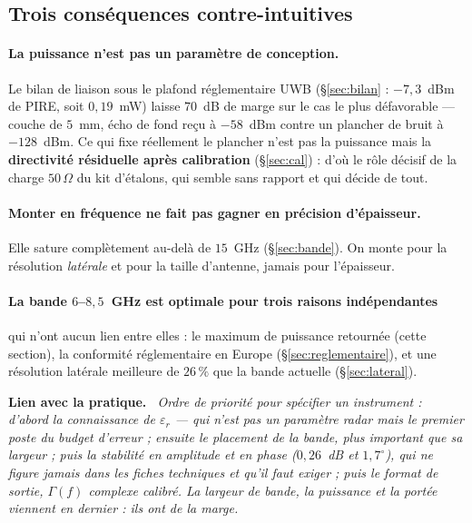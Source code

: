 \documentclass[11pt,a4paper]{article}
\newenvironment{implication}%
  {\par\medskip\begin{lrbox}{\implbox}\begin{minipage}{0.95\textwidth}%
   \textbf{Lien avec la pratique.}\itshape\ }%
  {\end{minipage}\end{lrbox}\noindent\fbox{\usebox{\implbox}}\par\medskip}
\newcommand{\eps}{\varepsilon_r}
\begin{document}
\subsection{Trois conséquences contre-intuitives}

\paragraph{La puissance n'est pas un paramètre de conception.} Le bilan de
liaison sous le plafond réglementaire UWB (\S\ref{sec:bilan} : $-7{,}3$~dBm de
PIRE, soit $0{,}19$~mW) laisse $70$~dB de marge sur le cas le plus défavorable
--- couche de $5$~mm, écho de fond reçu à $-58$~dBm contre un plancher de bruit
à $-128$~dBm. Ce qui fixe réellement le plancher n'est pas la puissance mais la
\textbf{directivité résiduelle après calibration} (\S\ref{sec:cal}) : d'où le
rôle décisif de la charge $50\,\Omega$ du kit d'étalons, qui semble sans
rapport et qui décide de tout.

\paragraph{Monter en fréquence ne fait pas gagner en précision d'épaisseur.}
Elle sature complètement au-delà de $15$~GHz (\S\ref{sec:bande}). On monte pour
la résolution \emph{latérale} et pour la taille d'antenne, jamais pour
l'épaisseur.

\paragraph{La bande $6$--$8{,}5$~GHz est optimale pour trois raisons
indépendantes} qui n'ont aucun lien entre elles : le maximum de puissance
retournée (cette section), la conformité réglementaire en Europe
(\S\ref{sec:reglementaire}), et une résolution latérale meilleure de $26\,\%$
que la bande actuelle (\S\ref{sec:lateral}).

\begin{implication}
Ordre de priorité pour spécifier un instrument : d'abord la connaissance de
$\eps$ --- qui n'est pas un paramètre radar mais le premier poste du budget
d'erreur ; ensuite le \emph{placement} de la bande, plus important que sa
largeur ; puis la stabilité en amplitude et en phase ($0{,}26$~dB et
$1{,}7^\circ$), qui ne figure jamais dans les fiches techniques et qu'il faut
exiger ; puis le format de sortie, $\Gamma(f)$ complexe calibré. La largeur de
bande, la puissance et la portée viennent en dernier : ils ont de la marge.
\end{implication}
\end{document}
